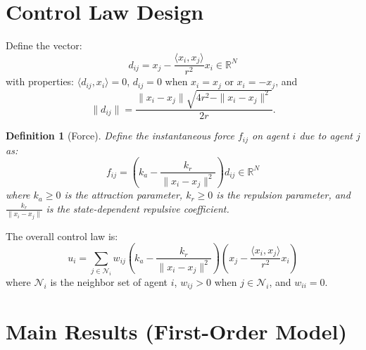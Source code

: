 \documentclass{article}
\newtheorem{definition}[theorem]{Definition}
\begin{document}
\section{Control Law Design}

Define the vector:
\begin{equation}
d_{ij} = x_j - \frac{\langle x_i, x_j \rangle}{r^2} x_i \in \mathbb{R}^N
\end{equation}
with properties: $\langle d_{ij}, x_i \rangle = 0$, $d_{ij} = 0$ when $x_i = x_j$ or $x_i = -x_j$, and
\begin{equation}
\|d_{ij}\| = \frac{\|x_i - x_j\| \sqrt{4r^2 - \|x_i - x_j\|^2}}{2r}.
\end{equation}

\begin{definition}[Force]
Define the instantaneous force $f_{ij}$ on agent $i$ due to agent $j$ as:
\begin{equation}
f_{ij} = \left(k_a - \frac{k_r}{\|x_i - x_j\|^2}\right) d_{ij} \in \mathbb{R}^N
\end{equation}
where $k_a \geq 0$ is the attraction parameter, $k_r \geq 0$ is the repulsion parameter, and $\frac{k_r}{\|x_i - x_j\|}$ is the state-dependent repulsive coefficient.
\end{definition}

The overall control law is:
\begin{equation}
u_i = \sum_{j \in \mathcal{N}_i} w_{ij} \left(k_a - \frac{k_r}{\|x_i - x_j\|^2}\right) \left(x_j - \frac{\langle x_i, x_j \rangle}{r^2} x_i\right)
\end{equation}
where $\mathcal{N}_i$ is the neighbor set of agent $i$, $w_{ij} > 0$ when $j \in \mathcal{N}_i$, and $w_{ii} = 0$.

\section{Main Results (First-Order Model)}
\end{document}
